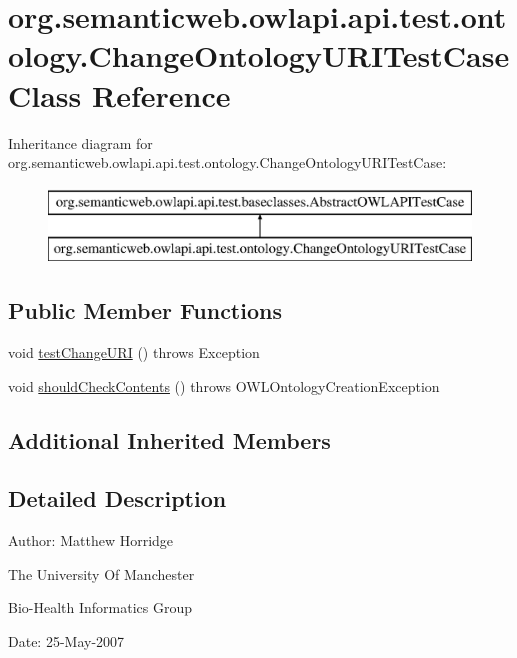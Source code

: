 \hypertarget{classorg_1_1semanticweb_1_1owlapi_1_1api_1_1test_1_1ontology_1_1_change_ontology_u_r_i_test_case}{\section{org.\-semanticweb.\-owlapi.\-api.\-test.\-ontology.\-Change\-Ontology\-U\-R\-I\-Test\-Case Class Reference}
\label{classorg_1_1semanticweb_1_1owlapi_1_1api_1_1test_1_1ontology_1_1_change_ontology_u_r_i_test_case}
}
Inheritance diagram for org.\-semanticweb.\-owlapi.\-api.\-test.\-ontology.\-Change\-Ontology\-U\-R\-I\-Test\-Case\-:\begin{figure}[H]
\begin{center}
\leavevmode
\includegraphics[height=2.000000cm]{classorg_1_1semanticweb_1_1owlapi_1_1api_1_1test_1_1ontology_1_1_change_ontology_u_r_i_test_case}
\end{center}
\end{figure}
\subsection*{Public Member Functions}
\begin{DoxyCompactItemize}
\item 
void \hyperlink{classorg_1_1semanticweb_1_1owlapi_1_1api_1_1test_1_1ontology_1_1_change_ontology_u_r_i_test_case_a2b35b019318a3d56b378fbaa0bd12a1d}{test\-Change\-U\-R\-I} ()  throws Exception 
\item 
void \hyperlink{classorg_1_1semanticweb_1_1owlapi_1_1api_1_1test_1_1ontology_1_1_change_ontology_u_r_i_test_case_a88ca45e943452a77b83451174d6f1a5e}{should\-Check\-Contents} ()  throws O\-W\-L\-Ontology\-Creation\-Exception 
\end{DoxyCompactItemize}
\subsection*{Additional Inherited Members}


\subsection{Detailed Description}
Author\-: Matthew Horridge\par
 The University Of Manchester\par
 Bio-\/\-Health Informatics Group\par
 Date\-: 25-\/\-May-\/2007\par
 \par
 

